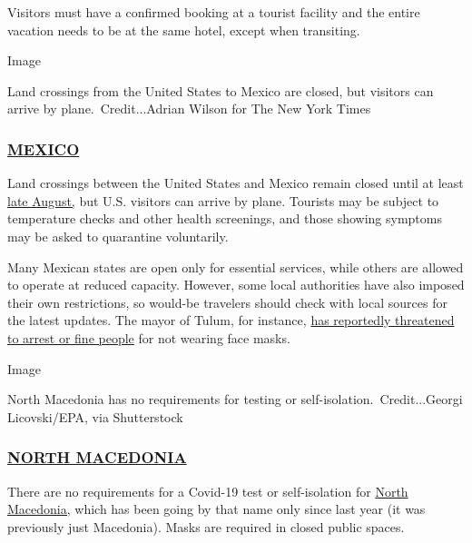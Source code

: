 Visitors must have a confirmed booking at a tourist facility and the
entire vacation needs to be at the same hotel, except when transiting.

Image

Land crossings from the United States to Mexico are closed, but visitors
can arrive by plane.~Credit...Adrian Wilson for The New York Times

\hypertarget{mexico}{%
\subsubsection{\texorpdfstring{\href{https://mx.usembassy.gov/health-alert-u-s-embassy-mexico-city-mexico/}{MEXICO}}{MEXICO}}\label{mexico}}

Land crossings between the United States and Mexico remain closed until
at least
\href{https://www.nytimes3xbfgragh.onion/aponline/2020/07/16/us/politics/ap-us-virus-outbreak-north-america-borders.html?searchResultPosition=6}{late
August,} but U.S. visitors can arrive by plane. Tourists may be subject
to temperature checks and other health screenings, and those showing
symptoms may be asked to quarantine voluntarily.

Many Mexican states are open only for essential services, while others
are allowed to operate at reduced capacity. However, some local
authorities have also imposed their own restrictions, so would-be
travelers should check with local sources for the latest updates. The
mayor of Tulum, for instance,
\href{https://www.reuters.com/article/us-health-coronavirus-mexico-restriction/mexico-tightens-coronavirus-curbs-in-tourist-spots-other-pockets-idUSKCN24H3E6}{has
reportedly threatened to arrest or fine people} for not wearing face
masks.

Image

North Macedonia has no requirements for testing or
self-isolation.~Credit...Georgi Licovski/EPA, via Shutterstock

\hypertarget{north-macedonia}{%
\subsubsection{\texorpdfstring{\href{https://mk.usembassy.gov/covid-19-information/}{NORTH
MACEDONIA}}{NORTH MACEDONIA}}\label{north-macedonia}}

There are no requirements for a Covid-19 test or self-isolation for
\href{https://www.nytimes3xbfgragh.onion/2019/05/17/travel/republic-of-north-macedonia-balkans.html}{North
Macedonia,} which has been going by that name only since last year (it
was previously just Macedonia). Masks are required in closed public
spaces.

